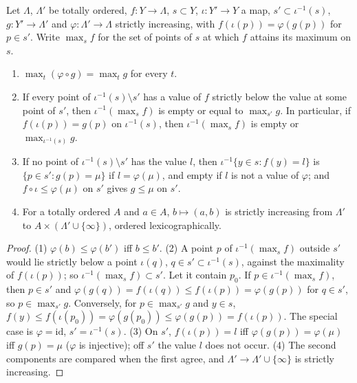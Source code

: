 \begin{lemma}
\label{bcalc:max-locus-local}
\mixedleanok
Let \(\Lambda\), \(\Lambda'\) be totally ordered, \(f\colon Y\to\Lambda\), \(s\subset Y\), \(\iota\colon Y'\to Y\) a map, \(s'\subset\iota^{-1}(s)\), \(g\colon Y'\to\Lambda'\) and
\(\varphi\colon\Lambda'\to\Lambda\) strictly increasing, with \(f(\iota(p))=\varphi(g(p))\) for \(p\in s'\). Write \(\max_sf\) for the set of points of \(s\) at which \(f\)
attains its maximum on \(s\).
\begin{enumerate}
\item \(\max_t(\varphi\circ g)=\max_tg\) for every \(t\).
\item If every point of \(\iota^{-1}(s)\setminus s'\) has a value of \(f\) strictly below the value at some point of \(s'\), then \(\iota^{-1}(\max_sf)\) is
empty or equal to \(\max_{s'}g\). In particular, if \(f(\iota(p))=g(p)\) on \(\iota^{-1}(s)\), then \(\iota^{-1}(\max_sf)\) is empty or \(\max_{\iota^{-1}(s)}g\).
\item If no point of \(\iota^{-1}(s)\setminus s'\) has the value \(l\), then \(\iota^{-1}\{y\in s:f(y)=l\}\) is \(\{p\in s':g(p)=\mu\}\) if \(l=\varphi(\mu)\), and empty
if \(l\) is not a value of \(\varphi\); and \(f\circ\iota\le\varphi(\mu)\) on \(s'\) gives \(g\le\mu\) on \(s'\).
\item For a totally ordered \(A\) and \(a\in A\), \(b\mapsto(a,b)\) is strictly increasing from \(\Lambda'\) to \(A\times(\Lambda'\cup\{\infty\})\), ordered
lexicographically.
\end{enumerate}
\end{lemma}
\begin{proof}
\mixedleanok
(1) \(\varphi(b)\le\varphi(b')\) iff \(b\le b'\). (2) A point \(p\) of \(\iota^{-1}(\max_sf)\) outside \(s'\) would lie strictly below a point \(\iota(q)\), \(q\in s'\subset\iota^{-1}(s)\),
against the maximality of \(f(\iota(p))\); so \(\iota^{-1}(\max_sf)\subset s'\). Let it contain \(p_0\). If \(p\in\iota^{-1}(\max_sf)\), then \(p\in s'\) and
\(\varphi(g(q))=f(\iota(q))\le f(\iota(p))=\varphi(g(p))\) for \(q\in s'\), so \(p\in\max_{s'}g\). Conversely, for \(p\in\max_{s'}g\) and \(y\in s\),
\(f(y)\le f(\iota(p_0))=\varphi(g(p_0))\le\varphi(g(p))=f(\iota(p))\). The special case is \(\varphi=\mathrm{id}\), \(s'=\iota^{-1}(s)\). (3) On \(s'\),
\(f(\iota(p))=l\) iff \(\varphi(g(p))=\varphi(\mu)\) iff \(g(p)=\mu\) (\(\varphi\) is injective); off \(s'\) the value \(l\) does not occur. (4) The second components are
compared when the first agree, and \(\Lambda'\to\Lambda'\cup\{\infty\}\) is strictly increasing.
\end{proof}

